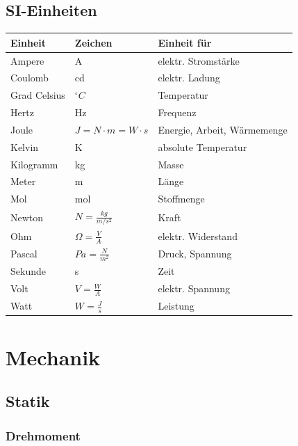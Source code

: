 \documentclass[
a4paper,
oneside,
landscape, 
8pt,
]{scrartcl}
\begin{document}
\begin{multicols*}{2}
\subsection{SI-Einheiten}
\begin{tabbing}
	\begin{tabu} to \linewidth {l l X}
		\toprule
		Einheit & Zeichen & Einheit für \\
		\midrule
		Ampere  & A & elektr. Stromstärke \\
		Coulomb & cd & elektr. Ladung \\
		Grad Celsius & $^\circ C$ & Temperatur \\
		Hertz & Hz & Frequenz \\
		Joule & $J = N \cdot m = W \cdot s$ & Energie, Arbeit, Wärmemenge \\
		Kelvin & K & absolute Temperatur \\
		Kilogramm & kg & Masse \\
		Meter & m & Länge \\
		Mol & mol & Stoffmenge \\
		Newton & $N = \frac{kg}{m/s^2}$ & Kraft \\
		Ohm & $\Omega = \frac{V}{A}$ & elektr. Widerstand \\
		Pascal & $Pa = \frac{N}{m^2}$ & Druck, Spannung \\
		Sekunde & s & Zeit\\
		Volt & $V = \frac{W}{A}$ & elektr. Spannung\\
		Watt & $W = \frac{J}{s}$ & Leistung \\
		\bottomrule
	 \end{tabu}
\end{tabbing}



\vfill\null
\columnbreak


\section{Mechanik}

\subsection{Statik}

\subsubsection{Drehmoment}


\end{multicols*}
\end{document}
